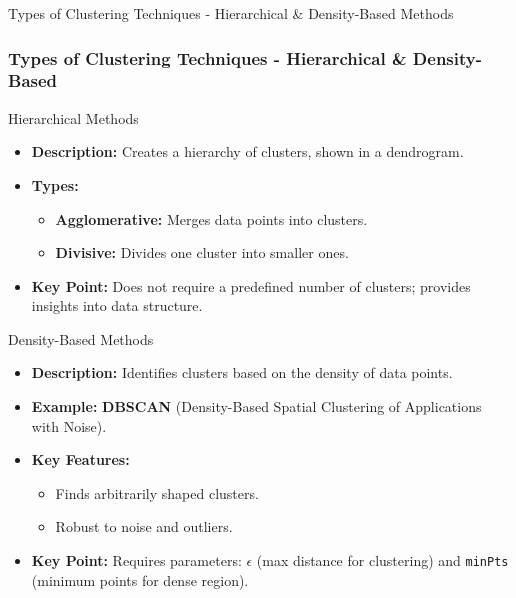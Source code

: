 \documentclass[aspectratio=169]{beamer}
\begin{document}
\begin{frame}[fragile]{Types of Clustering Techniques - Hierarchical & Density-Based Methods}
    \frametitle{Types of Clustering Techniques - Hierarchical & Density-Based}
    \begin{block}{Hierarchical Methods}
        \begin{itemize}
            \item \textbf{Description:} Creates a hierarchy of clusters, shown in a dendrogram.
            \item \textbf{Types:}
                \begin{itemize}
                    \item \textbf{Agglomerative:} Merges data points into clusters.
                    \item \textbf{Divisive:} Divides one cluster into smaller ones.
                \end{itemize}
            \item \textbf{Key Point:} Does not require a predefined number of clusters; provides insights into data structure.
        \end{itemize}
    \end{block}

    \begin{block}{Density-Based Methods}
        \begin{itemize}
            \item \textbf{Description:} Identifies clusters based on the density of data points.
            \item \textbf{Example:} \textbf{DBSCAN} (Density-Based Spatial Clustering of Applications with Noise).
            \item \textbf{Key Features:}
                \begin{itemize}
                    \item Finds arbitrarily shaped clusters.
                    \item Robust to noise and outliers.
                \end{itemize}
            \item \textbf{Key Point:} Requires parameters: $\epsilon$ (max distance for clustering) and \texttt{minPts} (minimum points for dense region).
        \end{itemize}
    \end{block}
\end{frame}
\end{document}
